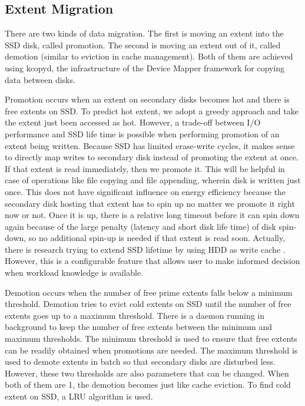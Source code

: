 
\subsection{Extent Migration}

There are two kinds of data migration. The first is moving an extent
into the SSD disk, called promotion. The second is moving an extent
out of it, called demotion (similar to eviction in cache management).
Both of them are achieved using kcopyd, the infrastructure of the Device
Mapper framework for copying data between disks. 

Promotion occurs when an extent on secondary disks becomes hot and
there is free extents on SSD. To predict hot extent, we adopt a greedy
approach and take the extent just been accessed as hot. However, a
trade-off between I/O performance and SSD life time is possible when
performing promotion of an extent being written. Because SSD has
limited erase-write cycles, it makes sense to directly map writes to
secondary disk instead of promoting the extent at once. If that extent
is read immediately, then we promote it. This will be helpful in case
of operations like file copying and file appending, wherein disk is
written just once. This does not have significant influence on energy
efficiency because the secondary disk hosting that extent has to spin
up no matter we promote it right now or not. Once it is up, there is a
relative long timeout before it can spin down again because of the
large penalty (latency and short disk life time) of disk spin-down,
so no additional spin-up is needed if that extent is read soon.
Actually, there is research trying to extend SSD lifetime by using HDD
as write cache \cite{hddcache}. However, this is a configurable
feature that allows user to make informed decision when workload
knowledge is available. 

Demotion occurs when the number of free prime extents falls below a
minimum threshold. Demotion tries to evict cold extents on SSD until
the number of free extents goes up to a maximum threshold. There is a
daemon running in background to keep the number of free extents
between the minimum and maximum thresholds. The minimum threshold is
used to ensure that free extents can be readily obtained when
promotions are needed. The maximum threshold is used to demote extents
in batch so that secondary disks are disturbed less. However, these
two thresholds are also parameters that can be changed. When both of
them are 1, the demotion becomes just like cache eviction. To find
cold extent on SSD, a LRU algorithm is used.

